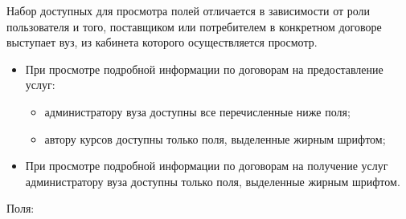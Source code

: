 Набор доступных для просмотра полей отличается в зависимости от роли пользователя и того, поставщиком или потребителем в конкретном договоре выступает вуз, из кабинета которого осуществляется просмотр.
\begin{itemize}
	\item При просмотре подробной информации по договорам на предоставление услуг:
	\begin{itemize}
		\item администратору вуза доступны все перечисленные ниже поля;
		\item автору курсов доступны только поля, выделенные жирным шрифтом;
	\end{itemize}
	\item При просмотре подробной информации по договорам на получение услуг администратору вуза доступны только поля, выделенные жирным шрифтом.
\end{itemize}
Поля:
